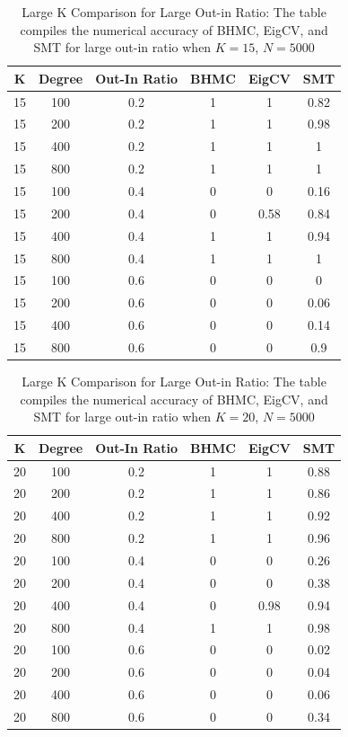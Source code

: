 \documentclass[11pt]{article}
\begin{document}
\begin{table}
\centering
\caption{Large K Comparison for Large Out-in Ratio: The table compiles the numerical accuracy of BHMC, EigCV, and SMT for large out-in ratio when $K =15$, $N = 5000$}\label{T6}
\begin{tabular}{|c | c | c | c | c | c |}
\hline
K & Degree & Out-In Ratio & BHMC & EigCV & SMT \\
\hline
15 & 100 & 0.2 & 1 & 1 & 0.82 \\
15 & 200 & 0.2 & 1 & 1 & 0.98 \\
15 & 400 & 0.2 & 1 & 1 & 1 \\
15 & 800 & 0.2 & 1 & 1 & 1 \\
\hline
15 & 100 & 0.4 & 0 & 0 & 0.16 \\
15 & 200 & 0.4 & 0 & 0.58 & 0.84 \\
15 & 400 & 0.4 & 1 & 1 & 0.94 \\
15 & 800 & 0.4 & 1 & 1 & 1 \\
\hline
15 & 100 & 0.6 & 0 & 0 & 0 \\
15 & 200 & 0.6 & 0 & 0 & 0.06 \\
15 & 400 & 0.6 & 0 & 0 & 0.14 \\
15 & 800 & 0.6 & 0 & 0 & 0.9 \\
\hline
\end{tabular}
\end{table}

\begin{table}
\centering
\caption{Large K Comparison for Large Out-in Ratio: The table compiles the numerical accuracy of BHMC, EigCV, and SMT for large out-in ratio when $K =20$, $N = 5000$}\label{T7}
\begin{tabular}{|c | c | c | c | c | c |}
\hline
K & Degree & Out-In Ratio & BHMC & EigCV & SMT \\
\hline
20 & 100 & 0.2 & 1 & 1 & 0.88 \\
20 & 200 & 0.2 & 1 & 1 & 0.86 \\
20 & 400 & 0.2 & 1 & 1 & 0.92 \\
20 & 800 & 0.2 & 1 & 1 & 0.96 \\
\hline
20 & 100 & 0.4 & 0 & 0 & 0.26 \\
20 & 200 & 0.4 & 0 & 0 & 0.38 \\
20 & 400 & 0.4 & 0 & 0.98 & 0.94 \\
20 & 800 & 0.4 & 1 & 1 & 0.98 \\
\hline
20 & 100 & 0.6 & 0 & 0 & 0.02 \\
20 & 200 & 0.6 & 0 & 0 & 0.04 \\
20 & 400 & 0.6 & 0 & 0 & 0.06 \\
20 & 800 & 0.6 & 0 & 0 & 0.34 \\
\hline
\end{tabular}
\end{table}
\end{document}
